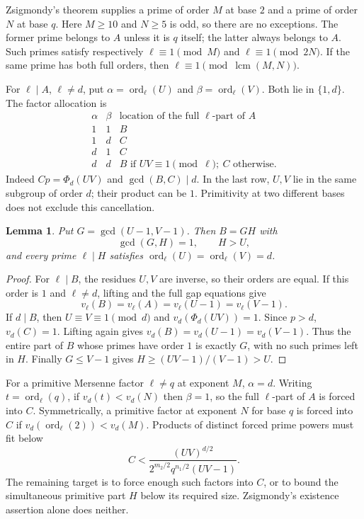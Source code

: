 \documentclass[11pt]{article}
\newtheorem{lemma}{Lemma}
\begin{document}
Zsigmondy's theorem \cite[Theorem 13]{GyorySmyth} supplies a prime
of order $M$ at base $2$ and a prime of order $N$ at base $q$.
Here $M\ge10$ and $N\ge5$ is odd, so there are no exceptions.
The former prime belongs to $A$ unless it is $q$ itself; the latter
always belongs to $A$. Such primes satisfy respectively
$\ell\equiv1\pmod M$ and $\ell\equiv1\pmod{2N}$.
If the same prime has both full orders, then
$\ell\equiv1\pmod{\operatorname{lcm}(M,N)}$.

For $\ell\mid A$, $\ell\ne d$, put
$\alpha=\operatorname{ord}_\ell(U)$ and
$\beta=\operatorname{ord}_\ell(V)$. Both lie in $\{1,d\}$.
The factor allocation is
\[
\begin{array}{c|c|c}
\alpha&\beta&\text{location of the full }\ell\text{-part of }A\\\hline
1&1&B\\
1&d&C\\
d&1&C\\
d&d&B\text{ if }UV\equiv1\pmod\ell;\ C\text{ otherwise}.
\end{array}
\]
Indeed $Cp=\Phi_d(UV)$ and $\gcd(B,C)\mid d$.
In the last row, $U,V$ lie in the same subgroup of order $d$;
their product can be $1$. Primitivity at two different bases does
not exclude this cancellation.

\begin{lemma}
Put $G=\gcd(U-1,V-1)$. Then $B=GH$ with
\[
\gcd(G,H)=1,\qquad H>U,
\]
and every prime $\ell\mid H$ satisfies
$\operatorname{ord}_\ell(U)=\operatorname{ord}_\ell(V)=d$.
\end{lemma}
\begin{proof}
For $\ell\mid B$, the residues $U,V$ are inverse, so their orders
are equal. If this order is $1$ and $\ell\ne d$, lifting and the
full gap equations give
\[
v_\ell(B)=v_\ell(A)=v_\ell(U-1)=v_\ell(V-1).
\]
If $d\mid B$, then $U\equiv V\equiv1\pmod d$ and
$v_d(\Phi_d(UV))=1$. Since $p>d$, $v_d(C)=1$.
Lifting again gives
$v_d(B)=v_d(U-1)=v_d(V-1)$.
Thus the entire part of $B$ whose primes have order $1$ is exactly
$G$, with no such primes left in $H$. Finally $G\le V-1$ gives
$H\ge(UV-1)/(V-1)>U$.
\end{proof}

For a primitive Mersenne factor $\ell\ne q$ at exponent $M$,
$\alpha=d$. Writing $t=\operatorname{ord}_\ell(q)$, if
$v_d(t)<v_d(N)$ then $\beta=1$, so the full $\ell$-part of $A$
is forced into $C$. Symmetrically, a primitive factor at exponent
$N$ for base $q$ is forced into $C$ if
$v_d(\operatorname{ord}_\ell(2))<v_d(M)$.
Products of distinct forced prime powers must fit below
\[
C<\frac{(UV)^{d/2}}{2^{m_2/2}q^{n_1/2}(UV-1)}.
\]
The remaining target is to force enough such factors into $C$, or
to bound the simultaneous primitive part $H$ below its required
size. Zsigmondy's existence assertion alone does neither.
\end{document}
